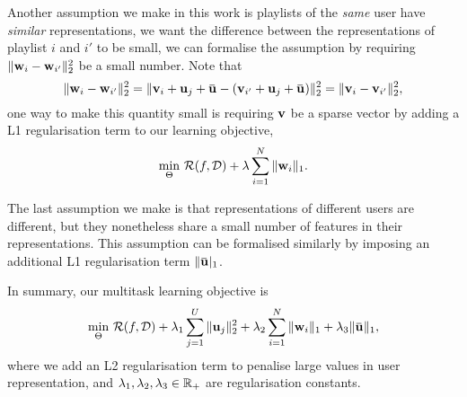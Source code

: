 Another assumption we make in this work is playlists of the \emph{same} user have \emph{similar} representations,
\ie we want the difference between the representations of playlist $i$ and $i'$ to be small,
we can formalise the assumption by requiring $\|\mathbf{w}_i - \mathbf{w}_{i'}\|_2^2$ be a small number. 
Note that
$$
\|\w_i - \w_{i'}\|_2^2 = \|\bv_i + \bu_j + \widebar\bu - (\bv_{i'} + \bu_j + \widebar\bu) \|_2^2 = \|\bv_i - \bv_{i'}\|_2^2,
$$
one way to make this quantity small is requiring $\mathbf{v}$ be a sparse vector by adding a L1 regularisation term 
to our learning objective, \ie
$$
\min_{\Theta} \, \mathcal{R}(f, \mathcal{D}) + \lambda \sum_{i=1}^N \|\mathbf{w}_i\|_1.
$$

The last assumption we make is that representations of different users are different, 
but they nonetheless share a small number of features in their representations.
This assumption can be formalised similarly by imposing an additional L1 regularisation term $\|\widebar\bu|_1$.

In summary, our multitask learning objective is
$$
\min_{\Theta} \, \RCal(f, \DCal) 
   + \lambda_1 \sum_{j=1}^U \|\bu_j\|_2^2 + \lambda_2 \sum_{i=1}^N \|\w_i\|_1 + \lambda_3 \|\widebar\bu\|_1,
$$
where we add an L2 regularisation term to penalise large values in user representation,
and $\lambda_1, \lambda_2, \lambda_3 \in \mathbb{R}_+$ are regularisation constants.
